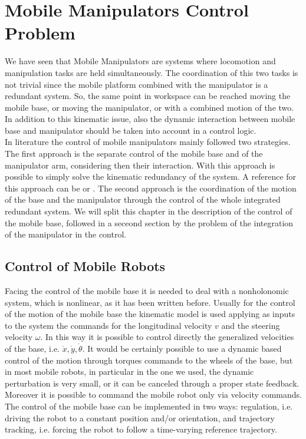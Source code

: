 \chapter{Mobile Manipulators Control Problem}
\label{chapter4}
We have seen that Mobile Manipulators are systems where locomotion and manipulation tasks are held simultaneously. The coordination of this two tasks is not trivial since the mobile platform combined with the manipulator is a redundant system. So, the same point in workspace can be reached moving the mobile base, or moving the manipulator, or with a combined motion of the two. In addition to this kinematic issue, also the dynamic interaction between mobile base and manipulator should be taken into account in a control logic. \\
In literature the control of mobile manipulators mainly followed two strategies. The first approach is the separate control of the mobile base and of the manipulator arm, considering then their interaction. With this approach is possible to simply solve the kinematic redundancy of the system. A reference for this approach can be \cite{liulewis} or \cite{chung1998interaction}. The second approach is the coordination of the motion of the base and the manipulator through the control of the whole integrated redundant system. 
We will split this chapter in the description of the control of the mobile base, followed in a seceond section by the problem of the integration of the manipulator in the control.
\section{Control of Mobile Robots}
Facing the control of the mobile base it is needed to deal with a nonholonomic system, which is nonlinear, as it has been written before.
Usually for the control of the motion of the mobile base the kinematic model is used applying as inputs to the system the commands for the longitudinal velocity $v$ and the steering velocity $\omega$. In this way it is possible to control directly the generalized velocities of the base, i.e. $\dot{x},\dot{y},\dot{\theta}$.
It would be certainly possible to use a dynamic based control of the motion through torques commands to the wheels of the base, but in most mobile robots, in particular in the one we used, the dynamic perturbation is very small, or it can be canceled through a proper state feedback. Moreover it is possible to command the mobile robot only via velocity commands.
The control of the mobile base can be implemented in two ways: regulation, i.e. driving the robot to a constant position and/or orientation, and trajectory tracking, i.e. forcing the robot to follow a time-varying reference trajectory.
